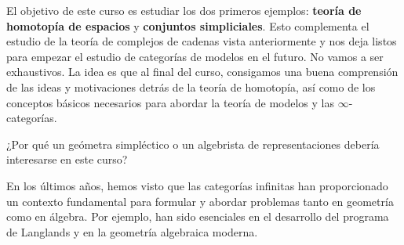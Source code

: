 El objetivo de este curso es estudiar los dos primeros ejemplos: \textbf{teoría de homotopía de espacios} y \textbf{conjuntos simpliciales}. Esto complementa el estudio de la teoría de complejos de cadenas vista anteriormente y nos deja listos para empezar el estudio de categorías de modelos en el futuro. No vamos a ser exhaustivos. La idea es que al final del curso, consigamos una buena comprensión de las ideas y motivaciones detrás de la teoría de homotopía, así como de los conceptos básicos necesarios para abordar la teoría de modelos y las $\infty$-categorías.

\begin{pregunta}
    ¿Por qué un geómetra simpléctico o un algebrista de representaciones debería interesarse en este curso?
\end{pregunta}

En los últimos años, hemos visto que las categorías infinitas han proporcionado un contexto fundamental para formular y abordar problemas tanto en geometría como en álgebra. Por ejemplo, han sido esenciales en el desarrollo del programa de Langlands y en la geometría algebraica moderna.

\subsection{}


